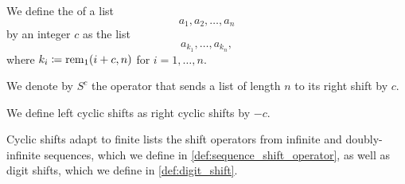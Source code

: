 \begin{definition}\label{def:cyclic_shift}\mimprovised
  We define the  of a list
  \begin{equation*}
    a_1, a_2, \ldots, a_n
  \end{equation*}
  by an integer \( c \) as the list
  \begin{equation*}
    a_{k_1}, \ldots, a_{k_n},
  \end{equation*}
  where \( k_i \coloneqq \operatorname{rem}_1(i + c, n) \) for \( i = 1, \ldots, n \).

  We denote by \( S^c \) the operator that sends a list of length \( n \) to its right shift by \( c \).

  We define left cyclic shifts as right cyclic shifts by \( -c \).
\end{definition}
\begin{comments}
  \item Cyclic shifts adapt to finite lists the shift operators from infinite and doubly-infinite sequences, which we define in \cref{def:sequence_shift_operator}, as well as digit shifts, which we define in \cref{def:digit_shift}.
\end{comments}

